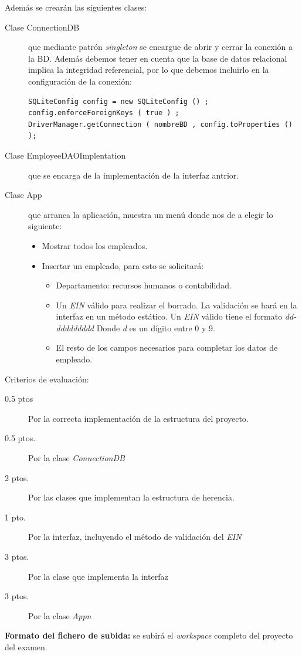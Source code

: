 \documentclass[addpoints,12pt]{exam}
\begin{document}
\begin{questions}
\begin{figure}[h]
\begin{center}
\end{center}
\end{figure}
Además se crearán las siguientes clases:
\begin{description}
\item[Clase ConnectionDB] que mediante patrón \emph{singleton} se encargue de abrir y cerrar la conexión a la BD. Además debemos tener en cuenta que la base de datos relacional implica la integridad referencial, por lo que debemos incluirlo en la configuración de la conexión:
\begin{verbatim}
SQLiteConfig config = new SQLiteConfig () ;
config.enforceForeignKeys ( true ) ;
DriverManager.getConnection ( nombreBD , config.toProperties () );
\end{verbatim}
\item[Clase EmployeeDAOImplentation] que se encarga de la implementación de la interfaz antrior.
\newpage
\item[Clase App] que arranca la aplicación, muestra un menú donde nos de a elegir  lo siguiente:
\begin{itemize}
\item Mostrar todos los empleados.
\item Insertar un empleado, para esto se solicitará:
\begin{itemize}
\item Departamento: recursos humanos o contabilidad.
\item Un \emph{EIN} válido para realizar el borrado. La validación se hará en la interfaz en un método estático. Un \emph{EIN} válido tiene el formato \emph{dd-ddddddddd} Donde \emph{d} es un dígito entre 0 y 9.
\item El resto de los campos necesarios para completar los datos de empleado.
\end{itemize} 
\end{itemize}
\end{description}


Criterios de evaluación:
\begin{description}
\item[0.5 ptos] Por la correcta implementación de la estructura del proyecto.
\item[0.5 ptos.] Por la clase \emph{ConnectionDB}
\item[2 ptos.] Por las clases que implementan la estructura de herencia.
\item[1 pto.] Por la interfaz, incluyendo el método de validación del \emph{EIN}
\item[3 ptos.] Por la clase que implementa la interfaz
\item[3 ptos.] Por la clase \emph{Appn}
\end{description}
\textbf{Formato del fichero de subida:} se subirá el \emph{workspace} completo del proyecto del examen.
\end{questions}
\end{document}
